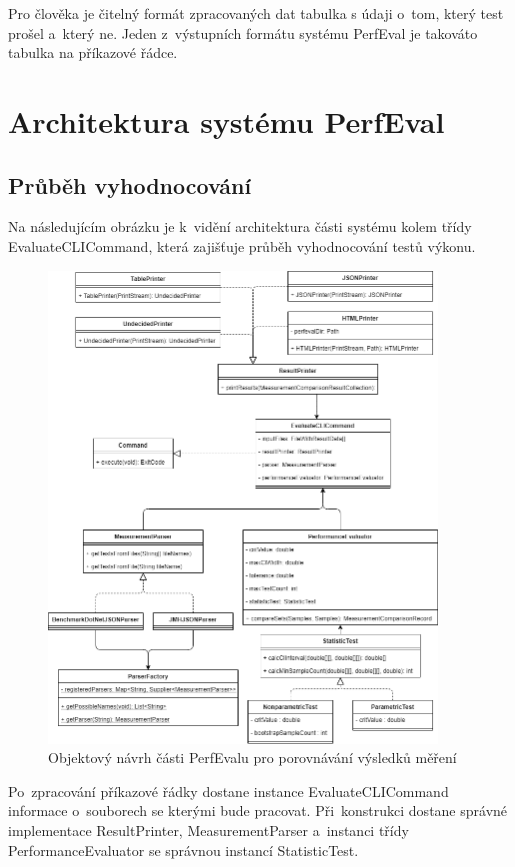 Pro člověka je čitelný formát zpracovaných dat tabulka s údaji o~tom, který test prošel a~který ne.
Jeden z~výstupních formátu systému PerfEval je takováto tabulka na příkazové řádce.

\section{Architektura systému PerfEval}

\subsection{Průběh vyhodnocování}

Na následujícím obrázku je k~vidění architektura části systému kolem třídy EvaluateCLICommand, která zajišťuje
průběh vyhodnocování testů výkonu.

\begin{figure}[!ht]
    \centering
    \includegraphics[width=0.92\textwidth]{../img/perfeval_evaluate.png}
    \caption{Objektový návrh části PerfEvalu pro porovnávání výsledků měření}
\end{figure}

Po~zpracování příkazové řádky dostane instance EvaluateCLICommand informace
o~souborech se kterými bude pracovat. Při~konstrukci dostane správné implementace ResultPrinter,
MeasurementParser a~instanci třídy PerformanceEvaluator se správnou instancí StatisticTest.

